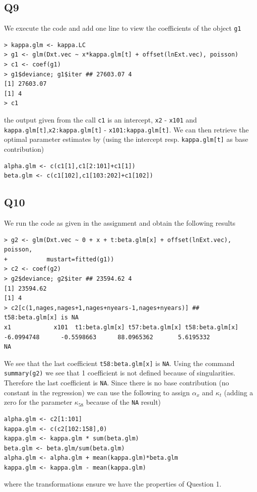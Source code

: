 \documentclass[11pt]{article}
\begin{document}
\subsection*{Q9}
We execute the code and add one line to view the coefficients of the object \verb|g1|

\begin{verbatim}
> kappa.glm <- kappa.LC
> g1 <- glm(Dxt.vec ~ x*kappa.glm[t] + offset(lnExt.vec), poisson)
> c1 <- coef(g1)
> g1$deviance; g1$iter ## 27603.07 4
[1] 27603.07
[1] 4
> c1
\end{verbatim}

the output given from the call \verb|c1| is an intercept, \verb|x2| - \verb|x101| and \verb|kappa.glm[t]|,\verb|x2:kappa.glm[t]| - \verb|x101:kappa.glm[t]|. We can then retrieve the optimal parameter estimates by (using the intercept resp. \verb|kappa.glm[t]| as base contribution)

\begin{verbatim}
alpha.glm <- c(c1[1],c1[2:101]+c1[1])
beta.glm <- c(c1[102],c1[103:202]+c1[102])
\end{verbatim}

\subsection*{Q10}
We run the code as given in the assignment and obtain the following results

\begin{verbatim}
> g2 <- glm(Dxt.vec ~ 0 + x + t:beta.glm[x] + offset(lnExt.vec), poisson,
+           mustart=fitted(g1))
> c2 <- coef(g2)
> g2$deviance; g2$iter ## 23594.62 4
[1] 23594.62
[1] 4
> c2[c(1,nages,nages+1,nages+nyears-1,nages+nyears)] ## t58:beta.glm[x] is NA
x1            x101  t1:beta.glm[x] t57:beta.glm[x] t58:beta.glm[x] 
-6.0994748      -0.5598663      88.0965362       5.6195332              NA
\end{verbatim}

We see that the last coefficient \verb|t58:beta.glm[x]| is \verb|NA|. Using the command \verb|summary(g2)| we see that 1 coefficient is not defined because of singularities. Therefore the last coefficient is \verb|NA|. Since there is no base contribution (no constant in the regression) we can use the following to assign $\alpha_x$ and $\kappa_t$ (adding a zero for the parameter $\kappa_{58}$ because of the \verb|NA| result)

\begin{verbatim}
alpha.glm <- c2[1:101]
kappa.glm <- c(c2[102:158],0)
kappa.glm <- kappa.glm * sum(beta.glm)
beta.glm <- beta.glm/sum(beta.glm)
alpha.glm <- alpha.glm + mean(kappa.glm)*beta.glm
kappa.glm <- kappa.glm - mean(kappa.glm)
\end{verbatim}
where the transformations ensure we have the properties of Question 1.
\end{document}
